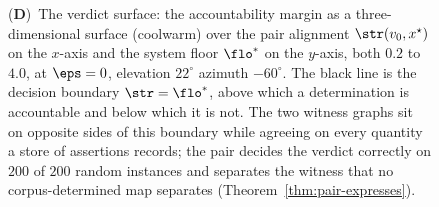 \begin{figure}[!htbp]
{    (\textbf{D})~The verdict surface: the accountability margin as a
    three-dimensional surface (coolwarm) over the pair alignment
    $\str(v_0,x^{\star})$ on the $x$-axis and the system floor $\flo^{\ast}$ on
    the $y$-axis, both $0.2$ to $4.0$, at $\eps=0$, elevation $22^{\circ}$
    azimuth $-60^{\circ}$. The black line is the decision boundary
    $\str=\flo^{\ast}$, above which a determination is accountable and below
    which it is not. The two witness graphs sit on opposite sides of this
    boundary while agreeing on every quantity a store of assertions records;
    the pair decides the verdict correctly on $200$ of $200$ random instances
    and separates the witness that no corpus-determined map separates
    (Theorem~\ref{thm:pair-expresses}).}
    \label{fig:panel6}
\end{figure}

